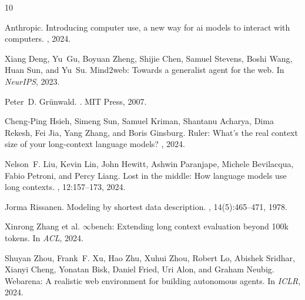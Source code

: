 \documentclass[10pt,twocolumn]{article}
\begin{document}

\begin{thebibliography}{10}

Anthropic.
\newblock Introducing computer use, a new way for ai models to interact with computers.
, 2024.

Xiang Deng, Yu~Gu, Boyuan Zheng, Shijie Chen, Samuel Stevens, Boshi Wang, Huan Sun, and Yu~Su.
\newblock Mind2web: Towards a generalist agent for the web.
\newblock In {\em NeurIPS}, 2023.

Peter~D. Gr{\"u}nwald.
.
\newblock MIT Press, 2007.

Cheng-Ping Hsieh, Simeng Sun, Samuel Kriman, Shantanu Acharya, Dima Rekesh, Fei Jia, Yang Zhang, and Boris Ginsburg.
\newblock Ruler: What's the real context size of your long-context language models?
, 2024.

Nelson~F. Liu, Kevin Lin, John Hewitt, Ashwin Paranjape, Michele Bevilacqua, Fabio Petroni, and Percy Liang.
\newblock Lost in the middle: How language models use long contexts.
, 12:157--173, 2024.

Jorma Rissanen.
\newblock Modeling by shortest data description.
, 14(5):465--471, 1978.

Xinrong Zhang et al.
\newblock $\infty$bench: Extending long context evaluation beyond 100k tokens.
\newblock In {\em ACL}, 2024.

Shuyan Zhou, Frank~F. Xu, Hao Zhu, Xuhui Zhou, Robert Lo, Abishek Sridhar, Xianyi Cheng, Yonatan Bisk, Daniel Fried, Uri Alon, and Graham Neubig.
\newblock Webarena: A realistic web environment for building autonomous agents.
\newblock In {\em ICLR}, 2024.

\end{thebibliography}
\end{document}

